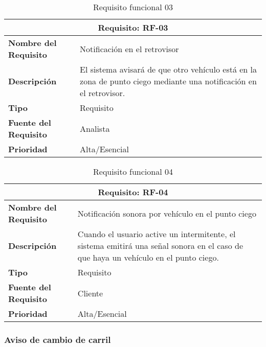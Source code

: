\documentclass[10pt,a4paper,oldfontcommands]{dpds}
\begin{document}
\begin{table}[H]
\begin{center}
\begin{tabular}{p{} p{7cm}}
\multicolumn{2}{c}{\textbf{Requisito: RF-03} } \\
\hline \hline
\textbf{Nombre del Requisito} & Notificación en el retrovisor \\
\textbf{Descripción} & El sistema avisará de que otro vehículo está en la zona de punto ciego mediante una notificación en el retrovisor.\\
\textbf{Tipo} & Requisito  \\
\textbf{Fuente del Requisito} & Analista  \\
\textbf{Prioridad} & Alta/Esencial  \\ \hline
\end{tabular}
\caption{Requisito funcional 03}
\label{tab:personal}
\end{center}
\end{table}

\begin{table}[H]
\begin{center}
\begin{tabular}{p{} p{7cm}}
\multicolumn{2}{c}{\textbf{Requisito: RF-04} } \\
\hline \hline
\textbf{Nombre del Requisito} & Notificación sonora por vehículo en el punto ciego  \\
\textbf{Descripción} &  Cuando el usuario active un intermitente, el sistema emitirá una señal sonora en el caso de que haya un vehículo en el punto ciego. \\
\textbf{Tipo} & Requisito  \\
\textbf{Fuente del Requisito} & Cliente  \\
\textbf{Prioridad} & Alta/Esencial  \\ \hline
\end{tabular}
\caption{Requisito funcional 04}
\label{tab:personal}
\end{center}
\end{table}


\subsubsection{Aviso de cambio de carril}
\end{document}
